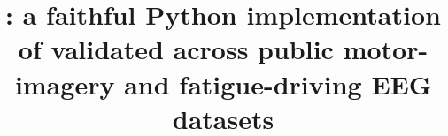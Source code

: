 \documentclass[11pt]{article}
\title{\tool: a faithful Python implementation of \blinker{} validated across public motor-imagery and fatigue-driving EEG datasets}
\author{}
\date{}
\begin{document}
\maketitle

\begin{abstract}

\end{abstract}







\printbibliography[title={References}]
\end{document}
